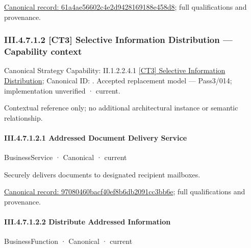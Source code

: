 {\footnotesize \href{../../../../../../../../continuum/business/business-function/61a4ae56602c4e2d9428169188e458d8.md}{Canonical record: 61a4ae56602c4e2d9428169188e458d8}; full qualifications and provenance.}\par
\subsubsection*{III.4.7.1.2 [CT3] Selective Information Distribution — Capability context}
\label{navigation:III.4.7.1.2}

{\small Canonical Strategy Capability: II.1.2.2.4.1 \hyperref[element:87869a1eec5f4c7cb87600a06cc8fd6e]{[CT3] Selective Information Distribution}; Canonical ID: \texttt{}. Accepted replacement model — Pass3/014; implementation unverified · current.}\par
Contextual reference only; no additional architectural instance or semantic relationship.\par
\paragraph*{III.4.7.1.2.1 Addressed Document Delivery Service}
\label{navigation:III.4.7.1.2.1}

\label{element:97080460bacf40ef8b6db2091cc3bb6e}
{\small BusinessService · Canonical · current}\par

Securely delivers documents to designated recipient mailboxes.


{\footnotesize \href{../../../../../../../../continuum/business/business-service/97080460bacf40ef8b6db2091cc3bb6e.md}{Canonical record: 97080460bacf40ef8b6db2091cc3bb6e}; full qualifications and provenance.}\par
\paragraph*{III.4.7.1.2.2 Distribute Addressed Information}
\label{navigation:III.4.7.1.2.2}

\label{element:6c9090a3d0a74a968475e05eb617e84f}
{\small BusinessFunction · Canonical · current}\par

